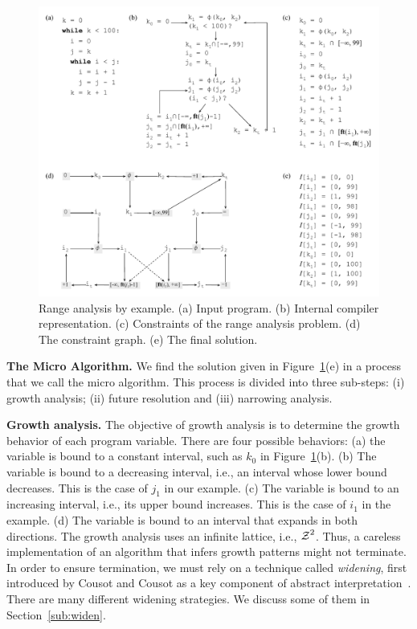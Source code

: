 \documentclass{llncs}
\newcommand{\varset}[1]{\mbox{$\cal{#1}$}}
\begin{document}
\begin{figure}[t!]
\begin{center}
\includegraphics[width=\textwidth]{images/overall_view}
\end{center}
\caption{\label{fig:overall_view}
Range analysis by example.
(a) Input program.
(b) Internal compiler representation.
(c) Constraints of the range analysis problem.
(d) The constraint graph.
(e) The final solution.}
\end{figure}

\noindent
\textbf{The Micro Algorithm.}
We find the solution given in Figure~\ref{fig:overall_view}(e) in a
process that we call the micro algorithm.
This process is divided into three sub-steps:
(i) growth analysis;
(ii) future resolution and
(iii) narrowing analysis.

\noindent
\textbf{Growth analysis. }
The objective of growth analysis is to determine the growth behavior of
each program variable.
There are four possible behaviors:
(a) the variable is bound to a constant interval,
such as $k_0$ in Figure~\ref{fig:overall_view}(b).
(b) The variable is bound to a decreasing interval, i.e., an interval whose
lower bound decreases.
This is the case of $j_1$ in our example.
(c) The variable is bound to an increasing interval, i.e., its upper bound
increases.
This is the case of $i_1$ in the example.
(d) The variable is bound to an interval that expands in both directions.
The growth analysis uses an infinite lattice, i.e., $\varset{Z}^2$.
Thus, a careless implementation of an algorithm that infers growth patterns
might not terminate.
In order to ensure termination, we must rely on a technique called
{\em widening}, first introduced by Cousot and Cousot as a key component
of abstract interpretation~\cite{Cousot77}.
There are many different widening strategies.
We discuss some of them in Section~\ref{sub:widen}.
\end{document}
